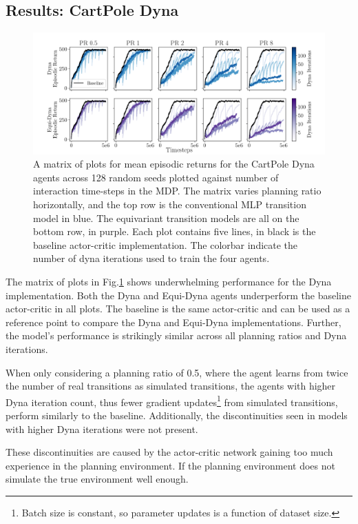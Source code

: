 \subsection{Results: CartPole Dyna}
\begin{figure}[h!]
	\centering
	\includegraphics[width=\textwidth]{Figures/dyna_sweep_cp.png}
	\caption{A matrix of plots for mean episodic returns for the CartPole Dyna agents across 128 random seeds
		plotted against number of interaction time-steps in the MDP. The matrix varies planning ratio horizontally, and the top row is the conventional MLP transition model in blue. The equivariant transition models are all on the bottom row, in purple. Each plot contains five lines, in black is the baseline actor-critic implementation. The colorbar indicate the number of dyna iterations used to train the four agents.}
	\label{fig:cp_dyna}
\end{figure}

The matrix of plots in Fig.\ref{fig:cp_dyna} shows underwhelming performance for the Dyna implementation. Both the Dyna and Equi-Dyna agents underperform the baseline actor-critic in all plots. The baseline is the same actor-critic and can be used as a reference point to compare the Dyna and Equi-Dyna implementations. Further, the model's performance is strikingly similar across all planning ratios and Dyna iterations.

When only considering a planning ratio of 0.5, where the agent learns from twice the number of real transitions as simulated transitions, the agents with higher Dyna iteration count, thus fewer gradient updates\footnote{Batch size is constant, so parameter updates is a function of dataset size.} from simulated transitions, perform similarly to the baseline. Additionally, the discontinuities seen in models with higher Dyna iterations were not present.

These discontinuities are caused by the actor-critic network gaining too much experience in the planning environment. If the planning environment does not simulate the true environment well enough.

